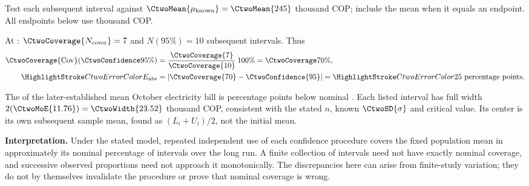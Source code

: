 Test each subsequent interval against $\CtwoMean{\mu_{\mathrm{known}}}=\CtwoMean{245}$ thousand COP; include the mean when it equals an endpoint. All endpoints below use thousand COP.



At : $\CtwoCoverage{N_{\mathrm{cover}}}=7$ and $N(95\%)=10$ subsequent intervals. Thus
\[\begin{aligned}
\CtwoCoverage{\mathrm{Cov}}(\CtwoConfidence{95\%})&=\frac{\CtwoCoverage{7}}{\CtwoCoverage{10}}\,100\%=\CtwoCoverage{70\%},\\
\CtwoError{E_{\mathrm{abs}}}&=|\CtwoCoverage{70}-\CtwoConfidence{95}|=\CtwoError{25}\text{ percentage points}.
\end{aligned}\]

The  of the later-established mean October electricity bill is  percentage points below nominal . Each listed interval has full width $2(\CtwoMoE{11.76})=\CtwoWidth{23.52}$ thousand COP, consistent with the stated $n$, known $\CtwoSD{\sigma}$ and critical value. Its center is its own subsequent sample mean, found as $(L_i+U_i)/2$, not the initial mean.

\textbf{Interpretation.} Under the stated model, repeated independent use of each confidence procedure covers the fixed population mean in approximately its nominal percentage of intervals over the long run. A finite collection of intervals need not have exactly nominal coverage, and successive observed proportions need not approach it monotonically. The discrepancies here can arise from finite-study variation; they do not by themselves invalidate the procedure or prove that nominal coverage is wrong.


